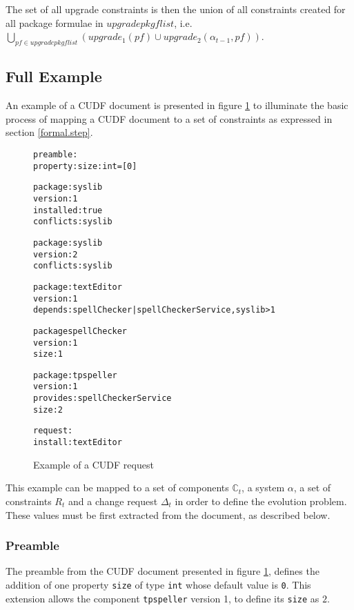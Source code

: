 The set of all upgrade constraints is then the union of all constraints created for all package formulae in $upgradepkgflist$,
i.e. $\bigcup \limits_{pf \in upgradepkgflist} (upgrade_1(pf) \cup upgrade_2(\alpha_{t-1},pf))$.


\subsection{Full Example}
\label{formal.example}
An example of a CUDF document is presented in figure \ref{formal.CUDFEXAMPLE} to illuminate the basic process of mapping a CUDF document to a set of constraints as expressed in section \ref{formal.step}.

\begin{figure}[htp] 
\begin{center}
\begin{alltt}
preamble:
property: size: int = [0]

package: syslib
version: 1
installed: true
conflicts: syslib

package: syslib
version: 2
conflicts: syslib

package: textEditor
version: 1
depends: spellChecker | spellCheckerService, syslib > 1

package spellChecker
version: 1
size: 1

package: tpspeller
version: 1
provides: spellCheckerService
size: 2

request:
install:textEditor

\end{alltt}
  \caption[CUDF Example]{Example of a CUDF request}
  \label{formal.CUDFEXAMPLE}
\end{center}
\end{figure} 

This example can be mapped to a set of components $\mathbb{C}_t$, a system $\alpha$, a set of constraints $R_t$ and a change request $\Delta_t$ in order to define the evolution problem.
These values must be first extracted from the document, as described below.

\subsubsection{Preamble}
The preamble from the CUDF document presented in figure \ref{formal.CUDFEXAMPLE}, 
defines the addition of one property \verb+size+ of type \verb+int+ whose default value is \verb+0+.
This extension allows the component \verb+tpspeller+ version 1, to define its \verb+size+ as $2$.


